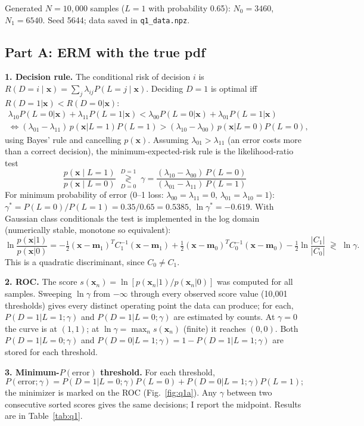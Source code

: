 \documentclass[10pt]{article}
\newcommand{\x}{\mathbf{x}}
\newcommand{\m}{\mathbf{m}}
\begin{document}
Generated $N=10{,}000$ samples ($L=1$ with probability 0.65): $N_0=3460$, $N_1=6540$. Seed 5644; data saved in \texttt{q1\_data.npz}.

\subsection*{Part A: ERM with the true pdf}

\textbf{1. Decision rule.} The conditional risk of decision $i$ is $R(D{=}i\mid\x)=\sum_j\lambda_{ij}P(L{=}j\mid\x)$. Deciding $D=1$ is optimal iff $R(D{=}1|\x)<R(D{=}0|\x)$:
\begin{gather*}
\lambda_{10}P(L{=}0|\x)+\lambda_{11}P(L{=}1|\x) < \lambda_{00}P(L{=}0|\x)+\lambda_{01}P(L{=}1|\x)\\
\iff (\lambda_{01}-\lambda_{11})\,p(\x|L{=}1)P(L{=}1) > (\lambda_{10}-\lambda_{00})\,p(\x|L{=}0)P(L{=}0),
\end{gather*}
using Bayes' rule and cancelling $p(\x)$. Assuming $\lambda_{01}>\lambda_{11}$ (an error costs more than a correct decision), the minimum-expected-risk rule is the likelihood-ratio test
\[
\boxed{\;\frac{p(\x\mid L=1)}{p(\x\mid L=0)} \;\underset{D=0}{\overset{D=1}{\gtrless}}\; \gamma=\frac{(\lambda_{10}-\lambda_{00})\,P(L=0)}{(\lambda_{01}-\lambda_{11})\,P(L=1)}\;}
\]
For minimum probability of error (0--1 loss: $\lambda_{00}=\lambda_{11}=0$, $\lambda_{01}=\lambda_{10}=1$): $\gamma^*=P(L{=}0)/P(L{=}1)=0.35/0.65=0.5385$, $\ln\gamma^*=-0.619$.
With Gaussian class conditionals the test is implemented in the log domain (numerically stable, monotone so equivalent):
\[
\ln\frac{p(\x|1)}{p(\x|0)} = -\tfrac12(\x-\m_1)^T C_1^{-1}(\x-\m_1)+\tfrac12(\x-\m_0)^T C_0^{-1}(\x-\m_0)-\tfrac12\ln\frac{|C_1|}{|C_0|}\;\gtrless\;\ln\gamma .
\]
This is a quadratic discriminant, since $C_0\neq C_1$.

\textbf{2. ROC.} The score $s(\x_n)=\ln[p(\x_n|1)/p(\x_n|0)]$ was computed for all samples. Sweeping $\ln\gamma$ from $-\infty$ through every observed score value (10{,}001 thresholds) gives every distinct operating point the data can produce; for each, $P(D{=}1|L{=}1;\gamma)$ and $P(D{=}1|L{=}0;\gamma)$ are estimated by counts. At $\gamma=0$ the curve is at $(1,1)$; at $\ln\gamma=\max_n s(\x_n)$ (finite) it reaches $(0,0)$. Both $P(D{=}1|L{=}0;\gamma)$ and $P(D{=}0|L{=}1;\gamma)=1-P(D{=}1|L{=}1;\gamma)$ are stored for each threshold.

\textbf{3. Minimum-$P(\text{error})$ threshold.} For each threshold,
\[P(\text{error};\gamma)=P(D{=}1|L{=}0;\gamma)P(L{=}0)+P(D{=}0|L{=}1;\gamma)P(L{=}1);\]
the minimizer is marked on the ROC (Fig.~\ref{fig:q1a}). Any $\gamma$ between two consecutive sorted scores gives the same decisions; I report the midpoint. Results are in Table~\ref{tab:q1}.
\end{document}

